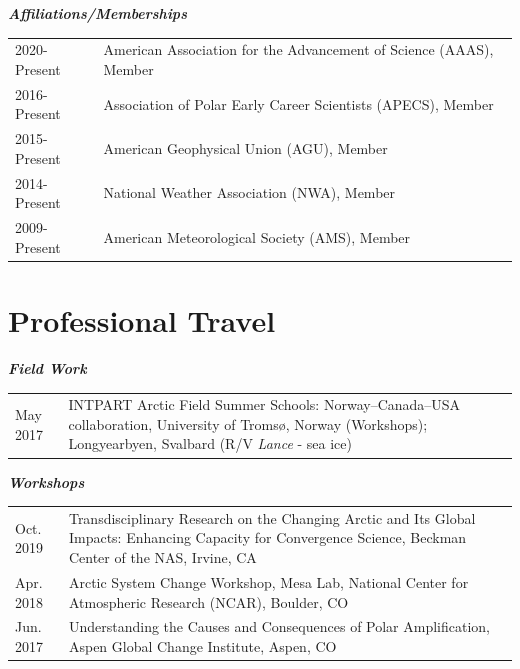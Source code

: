 \documentclass[margin,line,palatino,courier,10pt]{res}
\begin{document}
\begin{resume}
\textit{\textbf{Affiliations/Memberships}}
\vspace*{0.05in}\\
\begin{tabular}{@{}p{0.9in}p{4in}}
2020-Present & American Association for the Advancement of Science (AAAS), Member\\
2016-Present & Association of Polar Early Career Scientists (APECS), Member\\ 
2015-Present & American Geophysical Union (AGU), Member\\
2014-Present & National Weather Association (NWA), Member\\
2009-Present & American Meteorological Society (AMS), Member\\
\end{tabular}
\section{\sc \textcolor{Cerulean}{\large{\textbf{Professional Travel}}}}
\textit{\textbf{Field Work}}
\vspace*{0.05in}\\
\begin{tabular}{@{}p{0.9in}p{4in}}
May 2017 & INTPART Arctic Field Summer Schools: Norway--Canada--USA collaboration, University of Troms\o, Norway (Workshops); Longyearbyen, Svalbard (R/V \textit{Lance} - sea ice)
\end{tabular}

\textit{\textbf{Workshops}}
\vspace*{0.05in}\\
\begin{tabular}{@{}p{0.9in}p{4in}}
Oct. 2019 & Transdisciplinary Research on the Changing Arctic and Its Global Impacts:  Enhancing Capacity for Convergence Science, Beckman Center of the NAS, Irvine, CA\\
Apr. 2018 & Arctic System Change Workshop, Mesa Lab, National Center for Atmospheric Research (NCAR), Boulder, CO\\
Jun. 2017 & Understanding the Causes and Consequences of Polar Amplification, Aspen Global Change Institute, Aspen, CO
\end{tabular}


\end{resume}
\end{document}
